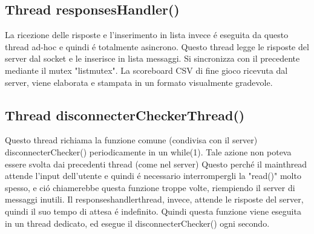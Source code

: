  \subsection{Thread responsesHandler()}
 La ricezione delle risposte e l'inserimento in lista invece \'e eseguita da questo thread ad-hoc e quindi \'e totalmente asincrono. Questo thread legge le risposte del server dal socket e le inserisce in lista messaggi. Si sincronizza con il precedente mediante il mutex "listmutex". La scoreboard CSV di fine gioco ricevuta dal server, viene elaborata e stampata in un formato visualmente gradevole.

 \subsection{Thread disconnecterCheckerThread()}
 Questo thread richiama la funzione comune (condivisa con il server) disconnecterChecker() periodicamente in un while(1). Tale azione non poteva essere svolta dai precedenti thread (come nel server) Questo perch\'e il mainthread attende l'input dell'utente e quindi \'e necessario interrompergli la "read()" molto spesso, e ci\'o chiamerebbe questa funzione troppe volte, riempiendo il server di messaggi inutili. Il responseshandlerthread, invece, attende le risposte del server, quindi il suo tempo di attesa \'e indefinito. Quindi questa funzione viene eseguita in un thread dedicato, ed esegue il disconnecterChecker() ogni secondo.

















